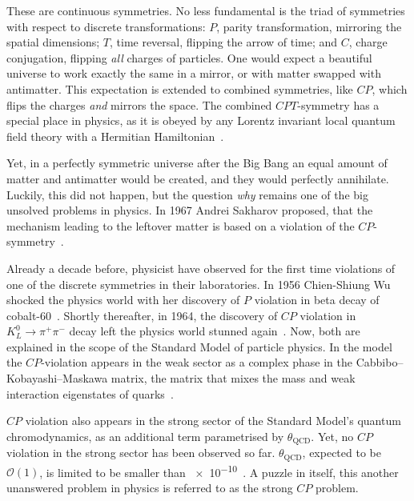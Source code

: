 These are continuous symmetries. No less fundamental is the triad of symmetries with respect to discrete transformations: $P$, parity transformation, mirroring the spatial dimensions; $T$, time reversal, flipping the arrow of time; and $C$, charge conjugation, flipping \emph{all} charges of particles. One would expect a beautiful universe to work exactly the same in a mirror, or with matter swapped with antimatter. This expectation is extended to combined symmetries, like $CP$, which flips the charges \emph{and} mirrors the space. The combined $CPT$-symmetry has a special place in physics, as it is obeyed by any Lorentz invariant local quantum field theory with a Hermitian Hamiltonian~\cite{Sachs1987}.

Yet, in a perfectly symmetric universe after the Big Bang an equal amount of matter and antimatter would be created, and they would perfectly annihilate. Luckily, this did not happen, but the question \emph{why} remains one of the big unsolved problems in physics.
In 1967 Andrei Sakharov proposed, that the mechanism leading to the leftover matter  is based on a violation of the $CP$-symmetry~\cite{0038-5670-34-5-A08}.

Already a decade before, physicist have observed for the first time violations of one of the discrete symmetries in their laboratories.
In 1956 Chien-Shiung Wu shocked the physics world with her discovery of $P$ violation in beta decay of cobalt-60~\cite{PhysRev.105.1413}. Shortly thereafter, in 1964, the discovery of $CP$ violation in $K^0_L \rightarrow \pi^+ \pi^-$ decay left the physics world stunned again~\cite{PhysRevLett.13.138}. Now, both are explained in the scope of the Standard Model of particle physics. In the model the $CP$-violation appears in the weak sector as a complex phase in the Cabbibo--Kobayashi--Maskawa matrix, the matrix that mixes the mass and weak interaction eigenstates of quarks~\cite{doi:10.1143/PTP.49.652}.

$CP$ violation also appears in the strong sector of the Standard Model's quantum chromodynamics, as an additional term parametrised by $\theta_\text{QCD}$. Yet, no $CP$ violation in the strong sector has been observed so far. $\theta_\text{QCD}$, expected to be $\mathcal{O}(1)$, is limited to be smaller than \num{e-10}~\cite{PDG2016}. A puzzle in itself, this another unanswered problem in physics is referred to as the strong $CP$ problem.

